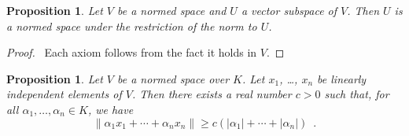 \documentclass{book}
\let\qed\relax
\newtheorem{prop}[ax]{Proposition}
\theoremstyle{definition}
\begin{document}
\begin{prop}
Let $V$ be a normed space and $U$ a vector subspace of $V$. Then $U$ is a normed space under the restriction of the norm to $U$.
\end{prop}

\begin{proof}
\pf\ Each axiom follows from the fact it holds in $V$. \qed
\end{proof}

\begin{prop}
\label{prop:lm1_3_12}
Let $V$ be a normed space over $K$. Let $x_1$, \ldots, $x_n$ be linearly independent elements of $V$. Then there exists a real number $c > 0$ such that, for all $\alpha_1, \ldots, \alpha_n \in K$, we have
\[ \| \alpha_1 x_1 + \cdots + \alpha_n x_n \| \geq c (|\alpha_1| + \cdots + |\alpha_n|) \enspace . \]
\end{prop}
\end{document}
